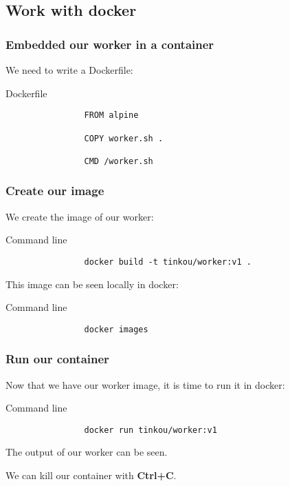 \subsection{Work with docker}

	\begin{frame}[fragile]
		\frametitle{Embedded our worker in a container}
		
		We need to write a Dockerfile:
		
		\begin{block}{Dockerfile}
			\begin{verbatim}
				FROM alpine

				COPY worker.sh .

				CMD /worker.sh
			\end{verbatim}
		\end{block}
	\end{frame}
	
	\begin{frame}[fragile]
		\frametitle{Create our image}
		
		We create the image of our worker:
		
		\begin{block}{Command line}
			\begin{verbatim}
				docker build -t tinkou/worker:v1 .
			\end{verbatim}
		\end{block}
		
		This image can be seen locally in docker:

		\begin{block}{Command line}
			\begin{verbatim}
				docker images
			\end{verbatim}
		\end{block}
		
	\end{frame}
	
	\begin{frame}[fragile]
		\frametitle{Run our container}
		
		Now that we have our worker image, it is time to run it in docker:
		
		\begin{block}{Command line}
			\begin{verbatim}
				docker run tinkou/worker:v1
			\end{verbatim}
		\end{block}
		The output of our worker can be seen.
		
		We can kill our container with \textbf{Ctrl+C}.
		
	\end{frame}
	
